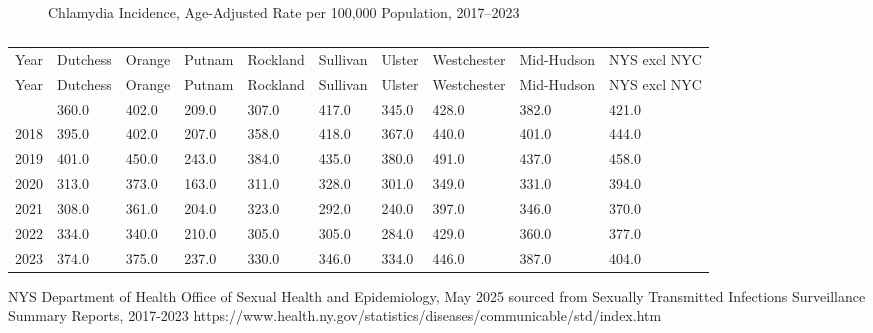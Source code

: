\documentclass[
  english,
  letterpaper,
]{report}
\begin{document}
\begin{figure}


\caption{\label{fig-chlamy-incident-aar}Chlamydia Incidence,
Age-Adjusted Rate per 100,000 Population, 2017--2023}

\end{figure}%

\begin{longtable}[]{@{}llllllllll@{}}

\caption{\label{tbl-chlamy-incident-aar}Chlamydia Incidence,
Age-Adjusted Rate per 100,000 Population, 2017--2023}

\tabularnewline

\caption{}\label{T_8098f}\tabularnewline
\toprule\noalign{}
Year & Dutchess & Orange & Putnam & Rockland & Sullivan & Ulster &
Westchester & Mid-Hudson & NYS excl NYC \\
\midrule\noalign{}
\endfirsthead
\toprule\noalign{}
Year & Dutchess & Orange & Putnam & Rockland & Sullivan & Ulster &
Westchester & Mid-Hudson & NYS excl NYC \\
\midrule\noalign{}
\endhead
\bottomrule\noalign{}
\endlastfoot
2017 & 360.0 & 402.0 & 209.0 & 307.0 & 417.0 & 345.0 & 428.0 & 382.0 &
421.0 \\
2018 & 395.0 & 402.0 & 207.0 & 358.0 & 418.0 & 367.0 & 440.0 & 401.0 &
444.0 \\
2019 & 401.0 & 450.0 & 243.0 & 384.0 & 435.0 & 380.0 & 491.0 & 437.0 &
458.0 \\
2020 & 313.0 & 373.0 & 163.0 & 311.0 & 328.0 & 301.0 & 349.0 & 331.0 &
394.0 \\
2021 & 308.0 & 361.0 & 204.0 & 323.0 & 292.0 & 240.0 & 397.0 & 346.0 &
370.0 \\
2022 & 334.0 & 340.0 & 210.0 & 305.0 & 305.0 & 284.0 & 429.0 & 360.0 &
377.0 \\
2023 & 374.0 & 375.0 & 237.0 & 330.0 & 346.0 & 334.0 & 446.0 & 387.0 &
404.0 \\

\end{longtable}

\begin{tcolorbox}[enhanced jigsaw, breakable, leftrule=.75mm, title=\textcolor{quarto-callout-note-color}{\faInfo}\hspace{0.5em}{Source}, bottomrule=.15mm, opacityback=0, left=2mm, colback=white, bottomtitle=1mm, coltitle=black, colbacktitle=quarto-callout-note-color!10!white, colframe=quarto-callout-note-color-frame, opacitybacktitle=0.6, toptitle=1mm, titlerule=0mm, arc=.35mm, rightrule=.15mm, toprule=.15mm]

NYS Department of Health Office of Sexual Health and Epidemiology, May
2025 sourced from Sexually Transmitted Infections Surveillance Summary
Reports, 2017-2023
https://www.health.ny.gov/statistics/diseases/communicable/std/index.htm

\end{tcolorbox}
\end{document}
